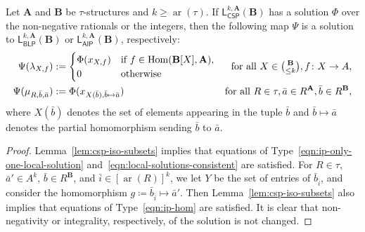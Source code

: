 \documentclass[a4paper,english, thm-restate]{lipics-v2021}
\newcommand{\tup}[1]{\bar{#1}}
\newcommand{\sig}{\tau}
\newcommand{\arity}[1]{\operatorname*{ar}(#1)}
\newcommand{\StructA}{\mathbf{A}}
\newcommand{\StructB}{\mathbf{B}}
\newcommand{\Hom}[2]{\mathrm{Hom}(#1,#2)}
\newcommand{\leqs}{\mathsf{L}}
\newcommand{\cspiso}[3]{\leqs^{#1,#2}_{\mathsf{CSP}}(#3)}
\newcommand{\blk}[3]{\leqs^{#1,#2}_{\mathsf{BLP}} (#3)}
\newcommand{\aipk}[3]{\leqs^{#1,#2}_{\mathsf{AIP}} (#3)}
\begin{document}
	\begin{lemma}\label{lem:cspiso-implies-aip}
		Let $\StructA$ and $\StructB$ be $\sig$-structures and $k \geq \arity{\sig}$.
		If $\cspiso{k}{\StructA}{\StructB}$ has a solution $\Phi$
		over the non-negative rationals or the integers, then the following map $\Psi$ is a solution to $\blk{k}{\StructA}{\StructB}$ or $\aipk{k}{\StructA}{\StructB}$, respectively:
		\begin{align*}
			\Psi(\lambda_{X,f}) &:= \begin{cases}
				\Phi(x_{X,f}) &\text{if } f\in \Hom{\StructB[X]}{\StructA},\\
				0 &\text{otherwise}
			\end{cases} & \text{for all } X \in \tbinom{\StructB}{\leq k}, f \colon X \to A,\\
			\Psi(\mu_{R,\tup{b},\tup{a}}) &:= \Phi (x_{X(\tup{b}), \tup{b} \mapsto \tup{a}}) & \text{for all } R \in \sig, \tup{a} \in R^\StructA, \tup{b} \in R^\StructB,
		\end{align*}
		where $X(\tup{b})$ denotes the set of elements appearing in the tuple $\tup{b}$ and $\tup{b} \mapsto \tup{a}$ denotes the partial homomorphism sending $\tup{b}$ to $\tup{a}$. 
	\end{lemma}
	\begin{proof}
		Lemma~\ref{lem:csp-iso-subsets} implies that equations of Type~\ref{eqn:ip-only-one-local-solution} and~\ref{eqn:local-solutions-consistent} are satisfied.
		For $R \in \sig$, $\tup{a}' \in A^k$, $\tup{b} \in R^\StructB$, and $\tup{i} \in [\arity{R}]^k$,
		we let $Y$ be the set of entries of $\tup{b}_{\tup{i}}$, and consider the homomorphism $g \coloneqq \tup{b}_{\tup{i}}\mapsto \tup{a}'$. Then
		Lemma~\ref{lem:csp-iso-subsets} also implies that equations of Type~\ref{eqn:ip-hom} are satisfied. 
		It is clear that non-negativity or integrality, respectively, of the solution is not changed.
	\end{proof}
	
\end{document}
